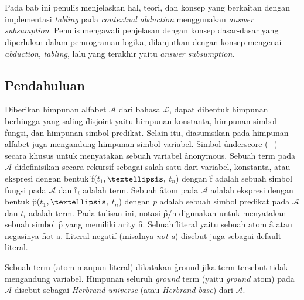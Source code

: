 \chapter{\babDua}
\label{bab2}


\addtocounter{babDuaNum}{2}
Pada bab ini penulis menjelaskan hal, teori, dan konsep yang berkaitan dengan implementasi \textit{tabling} pada \textit{contextual abduction} menggunakan \textit{answer subsumption}. Penulis mengawali penjelasan dengan konsep dasar-dasar yang diperlukan dalam pemrograman logika, dilanjutkan dengan konsep mengenai \textit{abduction}, \textit{tabling}, lalu yang terakhir yaitu \textit{answer subsumption}.
\section{Pendahuluan}
Diberikan himpunan alfabet $\mathcal{A}$ dari bahasa $\mathcal{L}$, dapat dibentuk himpunan berhingga yang saling \f{disjoint} yaitu himpunan konstanta, himpunan simbol fungsi, dan himpunan simbol predikat. Selain itu, diasumsikan pada himpunan alfabet juga mengandung himpunan simbol variabel. Simbol \f{underscore} (\_) secara khusus untuk menyatakan sebuah variabel \f{anonymous}. Sebuah term pada $\mathcal{A}$ didefinisikan secara rekursif sebagai salah satu dari variabel, konstanta, atau ekspresi dengan bentuk \f{f}(\textit{$t_{1}$}$, \textellipsis,$ \textit{$t_{n}$}) dengan \f{f} adalah sebuah simbol fungsi pada $\mathcal{A}$ dan \f{t$_{i}$} adalah term. Sebuah \f{atom} pada $\mathcal{A}$ adalah ekspresi dengan bentuk \f{p}(\textit{$t_{1}$}$, \textellipsis,$ \textit{$t_{n}$}) dengan \textit{p} adalah sebuah simbol predikat pada $\mathcal{A}$ dan \f{$t_{i}$} adalah term. Pada tulisan ini, notasi \f{p$/$n} digunakan untuk menyatakan sebuah simbol \f{p} yang memiliki arity \f{n}. Sebuah \f{literal} yaitu sebuah atom \f{a} atau negasinya \f{not a}. Literal negatif (misalnya \textit{not a}) disebut juga sebagai \f{default} literal. 

Sebuah term (atom maupun literal) dikatakan \f{ground} jika term tersebut tidak mengandung variabel. Himpunan seluruh \textit{ground} term (yaitu \textit{ground} atom) pada \( \mathcal{A} \) disebut sebagai \textit{Herbrand universe} (atau \textit{Herbrand base}) dari \( \mathcal{A} \).
\\

